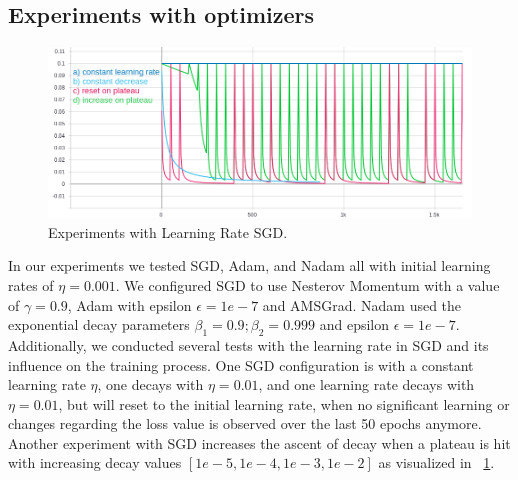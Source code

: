 \subsection*{Experiments with optimizers}
\begin{figure}[H]
    \centering
    \includegraphics[width=\textwidth,height=\textheight,keepaspectratio]{img/learning_rate2.png}
    \decoRule
    \caption[Experiments: Learning Rate SGD]{Experiments with Learning Rate SGD.}
    \label{fig:sgd-learning-rate}
\end{figure}
In our experiments we tested SGD, Adam, and Nadam all with initial learning rates of $\eta=0.001$.
We configured SGD to use Nesterov Momentum with a value of $\gamma=0.9$, Adam with epsilon $\epsilon=1e-7$ and AMSGrad.
Nadam used the exponential decay parameters $\beta_1=0.9; \beta_2=0.999$ and epsilon $\epsilon=1e-7$.
Additionally, we conducted several tests with the learning rate in SGD and its influence on the training process.
One SGD configuration is with a constant learning rate $\eta$, one decays with $\eta=0.01$, and one learning rate
decays with $\eta=0.01$, but will reset to the initial learning rate, when no significant learning or changes regarding
the loss value is observed over the last 50 epochs anymore.
Another experiment with SGD increases the ascent of decay when a plateau is hit with increasing decay values
$[1e-5, 1e-4, 1e-3, 1e-2]$ as visualized in ~\ref{fig:sgd-learning-rate}.




%




